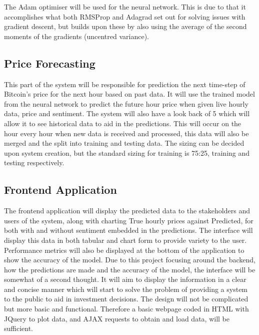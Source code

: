 \documentclass[oneside, 12pt]{article}
\begin{document}
		The Adam optimiser will be used for the neural network. This is due to that it accomplishes what both RMSProp and Adagrad set out for solving issues with gradient descent, but builds upon these by also using the average of the second moments of the gradients (uncentred variance).
		
		\subsection{Price Forecasting}
		This part of the system will be responsible for prediction the next time-step of Bitcoin's price for the next hour based on past data. It will use the trained model from the neural network to predict the future hour price when given live hourly data, price and sentiment. The system will also have a look back of 5 which will allow it to see historical data to aid in the predictions. This will occur on the hour every hour when new data is received and processed, this data will also be merged and the split into training and testing data. The sizing can be decided upon system creation, but the standard sizing for training is 75:25, training and testing respectively.
		
		\subsection{Frontend Application}
		The frontend application will display the predicted data to the stakeholders and users of the system, along with charting True hourly prices against Predicted, for both with and without sentiment embedded in the predictions. The interface will display this data in both tabular and chart form to provide variety to the user. Performance metrics will also be displayed at the bottom of the application to show the accuracy of the model. Due to this project focusing around the backend, how the predictions are made and the accuracy of the model, the interface will be somewhat of a second thought. It will aim to display the information in a clear and concise manner which will start to solve the problem of providing a system to the public to aid in investment decisions. The design will not be complicated but more basic and functional. Therefore a basic webpage coded in HTML with JQuery to plot data, and AJAX requests to obtain and load data, will be sufficient.
	
\end{document}
